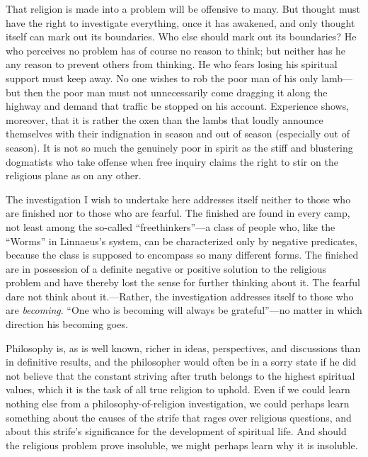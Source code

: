 \documentclass[12pt,a4paper]{book}
\newcommand{\opage}[1]{\marginnote{\footnotesize\textit{[#1]}}}
\begin{document}
That religion is made into a problem will be offensive to many. But
thought must have the right to investigate everything, once it has
awakened, and only thought itself can mark out its boundaries. Who else
should mark out its boundaries? He who perceives no problem has of
course no reason to think; but neither has he any reason to prevent
others from thinking. He who fears losing his spiritual support must
keep away. No one wishes to rob the poor man of his only lamb---but then
the poor man must not unnecessarily come dragging it along the highway
and demand that traffic be stopped on his account. Experience shows,
moreover, that it is rather the oxen than the lambs that loudly announce
themselves with their indignation in season and out of season
(especially out of season). It is not so much the genuinely poor in
spirit as the stiff and blustering dogmatists who take offense when free
inquiry claims the right to stir on the religious plane as on any other.

The investigation I wish to undertake here addresses itself neither to
those who are finished nor to those who are fearful. The finished are
found in every camp, not least among the so-called ``freethinkers''---a
class of people who, like the ``Worms'' in Linnaeus's system, can be
characterized only by negative predicates, because the class is supposed
to encompass so many different forms. The finished are in possession of
a definite negative or positive solution to the religious problem and
have thereby lost the sense for further thinking about it. The fearful
dare not think about it.---Rather, the investigation addresses itself to
those 
\opage{5}who are \emph{becoming}. ``One who is becoming will always be
grateful''---no matter in which direction his becoming goes.

Philosophy is, as is well known, richer in ideas, perspectives, and
discussions than in definitive results, and the philosopher would often
be in a sorry state if he did not believe that the constant striving
after truth belongs to the highest spiritual values, which it is the
task of all true religion to uphold. Even if we could learn nothing else
from a philosophy-of-religion investigation, we could perhaps learn
something about the causes of the strife that rages over religious
questions, and about this strife's significance for the development of
spiritual life. And should the religious problem prove insoluble, we
might perhaps learn why it is insoluble.

\medskip
\end{document}

